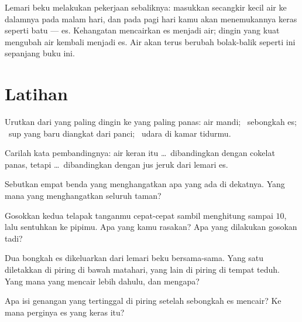 \begin{example}\label{ex:g1:hot-and-cold:freezer}
Lemari beku melakukan pekerjaan sebaliknya: masukkan secangkir kecil
air ke dalamnya pada malam hari, dan pada pagi hari kamu akan
menemukannya keras seperti batu --- es. Kehangatan mencairkan es
menjadi air; dingin yang kuat mengubah air kembali menjadi es. Air
akan terus berubah bolak-balik seperti ini sepanjang buku ini.
\end{example}

\section{Latihan}

\begin{exercise}[$\star$]\label{exo:g1:hot-and-cold:1}
Urutkan dari yang paling dingin ke yang paling panas: air mandi; \ sebongkah
es; \ sup yang baru diangkat dari panci; \ udara di kamar tidurmu.
\end{exercise}

\begin{exercise}[$\star$]\label{exo:g1:hot-and-cold:2}
Carilah kata pembandingnya: air keran itu \dots\ dibandingkan dengan
cokelat panas, tetapi \dots\ dibandingkan dengan jus jeruk dari lemari
es.
\end{exercise}

\begin{exercise}[$\star$]\label{exo:g1:hot-and-cold:3}
Sebutkan empat benda yang menghangatkan apa yang ada di dekatnya. Yang
mana yang menghangatkan seluruh taman?
\end{exercise}

\begin{exercise}[$\star$]\label{exo:g1:hot-and-cold:4}
Gosokkan kedua telapak tanganmu cepat-cepat sambil menghitung sampai
$10$, lalu sentuhkan ke pipimu. Apa yang kamu rasakan? Apa yang
dilakukan gosokan tadi?
\end{exercise}

\begin{exercise}[$\star$]\label{exo:g1:hot-and-cold:5}
Dua bongkah es dikeluarkan dari lemari beku bersama-sama. Yang satu
diletakkan di piring di bawah matahari, yang lain di piring di tempat
teduh. Yang mana yang mencair lebih dahulu, dan mengapa?
\end{exercise}

\begin{exercise}[$\star$]\label{exo:g1:hot-and-cold:6}
Apa isi genangan yang tertinggal di piring setelah sebongkah es
mencair? Ke mana perginya es yang keras itu?
\end{exercise}

